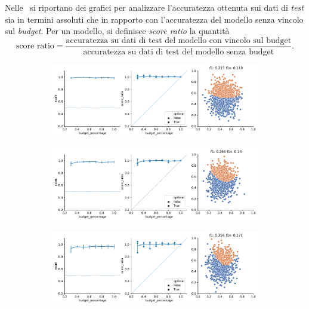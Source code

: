 Nelle~ si riportano dei grafici per analizzare l'accuratezza ottenuta sui dati di \emph{test} sia in termini assoluti che in rapporto con l'accuratezza del modello senza vincolo sul \emph{budget}.
Per un modello, si definisce \emph{score ratio} la quantità
\begin{equation*}
    \text{score ratio} = \frac{\text{accuratezza su dati di test del modello con vincolo sul budget}}{\text{accuratezza su dati di test del modello senza budget}}.
\end{equation*}
\begin{figure}
    \begin{subfigure}{.5\textwidth}
        \centering
        \includegraphics[width=\textwidth]{img/2d/1.pdf}
    \end{subfigure}%
    \begin{subfigure}{.5\textwidth}
        \centering
        \includegraphics[width=\textwidth]{img/2d/2.pdf}
    \end{subfigure}%
    \hfill
    \begin{subfigure}{.5\textwidth}
        \centering
        \includegraphics[width=\textwidth]{img/2d/3.pdf}

\end{subfigure}
\end{figure}
